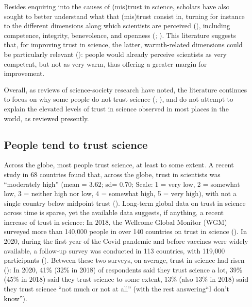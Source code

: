 \documentclass[
  man,
  floatsintext,
  longtable,
  nolmodern,
  notxfonts,
  notimes,
  colorlinks=true,linkcolor=blue,citecolor=blue,urlcolor=blue]{apa7}
\begin{document}
Besides enquiring into the causes of (mis)trust in science, scholars
have also sought to better understand what that (mis)trust consist in,
turning for instance to the different dimensions along which scientists
are perceived
(),
including competence, integrity, benevolence, and openness
(; ). This literature suggests that, for improving trust in
science, the latter, warmth-related dimensions could be particularly
relevant (): people would already perceive scientists as very competent, but
not as very warm, thus offering a greater margin for improvement.

Overall, as reviews of science-society research have noted, the
literature continues to focus on why some people do not trust science
(;
), and do
not attempt to explain the elevated levels of trust in science observed
in most places in the world, as reviewed presently.

\subsection{People tend to trust
science}\label{people-tend-to-trust-science}

Across the globe, most people trust science, at least to some extent. A
recent study in 68 countries found that, across the globe, trust in
scientists was ``moderately high'' (mean = 3.62; sd= 0.70; Scale: 1 =
very low, 2 = somewhat low, 3 = neither high nor low, 4 = somewhat high,
5 = very high), with not a single country below midpoint trust
().
Long-term global data on trust in science across time is sparse, yet the
available data suggests, if anything, a recent increase of trust in
science: In 2018, the Wellcome Global Monitor (WGM) surveyed more than
140,000 people in over 140 countries on trust in science
(). In 2020, during the first year of the Covid
pandemic and before vaccines were widely available, a follow-up survey
was conducted in 113 countries, with 119,000 participants
(). Between these two surveys, on average, trust in
science had risen
(): In 2020, 41\% (32\% in 2018) of respondents said
they trust science a lot, 39\% (45\% in 2018) said they trust science to
some extent, 13\% (also 13\% in 2018) said they trust science ``not much
or not at all'' (with the rest answering``I don't know'').
\end{document}
